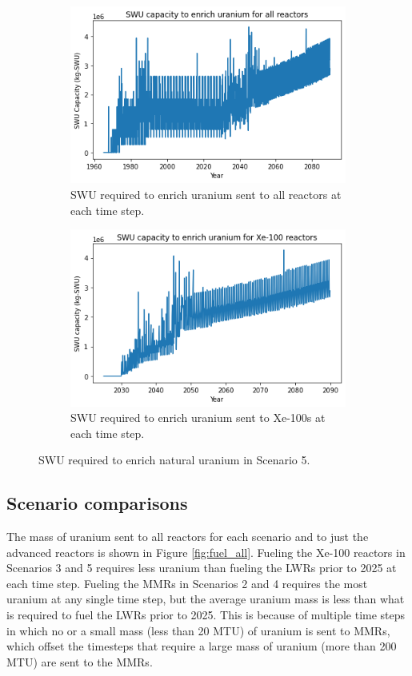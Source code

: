\begin{figure}
    \centering
    \begin{subfigure}{0.45\textwidth}
        \centering
        \includegraphics[scale=0.4]{../figures/totalswu_scenarios_5.png}
        \caption{\gls{SWU} required to enrich uranium sent to all reactors at each time step.}
        \label{fig:totalswu_5}
    \end{subfigure}
    \hspace{0.8cm}
    \begin{subfigure}{0.45\textwidth}
        \centering
        \includegraphics[scale=0.4]{../figures/haleuSWU_scenarios_5.png}
        \caption{\gls{SWU} required to enrich uranium sent to Xe-100s at each time step.}
        \label{fig:haleuswu_5}
    \end{subfigure}
    \caption{\gls{SWU} required to enrich natural uranium in Scenario 5.}
    \label{fig:swu_5}
\end{figure}

\subsection{Scenario comparisons}
The mass of uranium sent to all reactors for each scenario and to just the 
advanced reactors is shown in Figure \ref{fig:fuel_all}. Fueling the Xe-100 
reactors in Scenarios 3 and 5 requires less uranium than fueling the \glspl{LWR}
prior to 2025
at each time step. Fueling the \glspl{MMR} in Scenarios 2 and 4 requires the 
most uranium at any single time step, but the average uranium mass is less 
than what is required to fuel the \glspl{LWR} prior to 2025. This is because 
of multiple time steps in which no or a small mass (less than 20 MTU) 
of uranium is sent to \glspl{MMR}, which offset the timesteps that require 
a large mass of uranium (more than 200 MTU) are sent to the \glspl{MMR}. 

